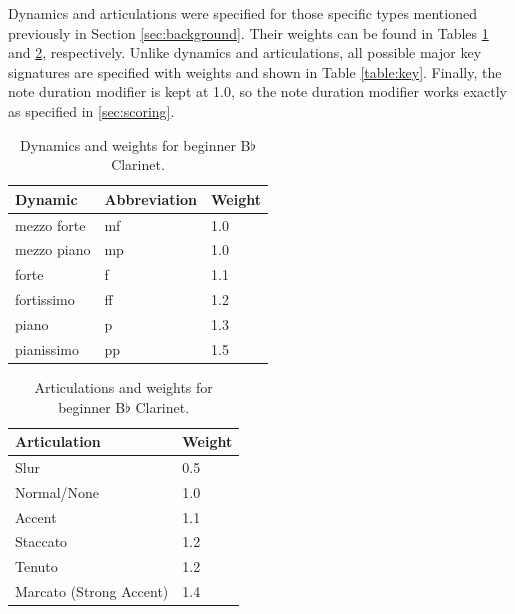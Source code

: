 \documentclass[10pt,preprint]{sigplanconf}
\begin{document}
Dynamics and articulations were specified for those specific types mentioned previously in Section \ref{sec:background}. Their weights can be found in Tables \ref{table:dynamics} and \ref{table:articulations}, respectively. Unlike dynamics and articulations, all possible major key signatures are specified with weights and shown in Table \ref{table:key}. Finally, the note duration modifier is kept at 1.0, so the note duration modifier works exactly as specified in \ref{sec:scoring}.

\begin{table}
	\centering
    \begin{tabular}{| l | l | l |}
        \hline
        Dynamic & Abbreviation & Weight \\ \hline
        mezzo forte & mf & 1.0 \\ \hline
        mezzo piano & mp & 1.0 \\ \hline
        forte & f & 1.1 \\ \hline
        fortissimo & ff & 1.2 \\ \hline
        piano & p & 1.3 \\ \hline
        pianissimo & pp & 1.5 \\
        \hline
    \end{tabular}
	\caption{Dynamics and weights for beginner B$\flat$ Clarinet.}
	\label{table:dynamics}
\end{table}

\begin{table}
	\centering
    \begin{tabular}{| l | l |}
        \hline
        Articulation & Weight \\ \hline
        Slur & 0.5 \\ \hline
        Normal/None & 1.0 \\ \hline
        Accent & 1.1 \\ \hline
        Staccato & 1.2 \\ \hline
        Tenuto & 1.2 \\ \hline
        Marcato (Strong Accent) & 1.4 \\
        \hline
    \end{tabular}
	\caption{Articulations and weights for beginner B$\flat$ Clarinet.}
	\label{table:articulations}
\end{table}
\end{document}
